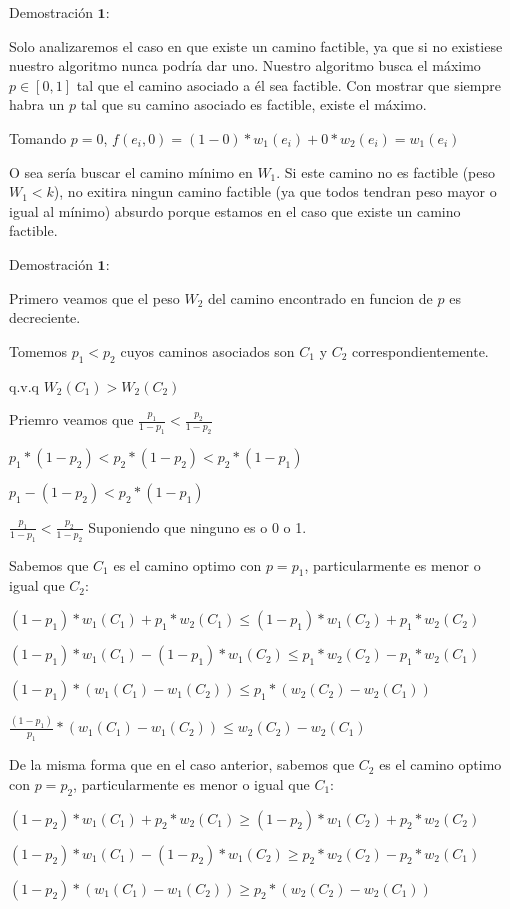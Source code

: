 Demostraci\'on $\mathbf{1}:$

Solo analizaremos el caso en que existe un camino factible, ya que si no existiese nuestro algoritmo nunca podr\'ia dar uno.
Nuestro algoritmo busca el m\'aximo $p \in [0,1]$ tal que el camino asociado a \'el sea factible. Con mostrar que siempre habra un $p$ tal que su camino asociado es factible, existe el m\'aximo.

Tomando $p=0$, $f(e_i,0) = (1-0)*w_1(e_i) + 0*w_2(e_i) = w_1(e_i)$

O sea ser\'ia buscar el camino m\'inimo en $W_1$. Si este camino no es factible (peso $W_1 < k$), no exitira ningun camino factible (ya que todos tendran peso mayor o igual al m\'inimo) absurdo porque estamos en el caso que existe un camino factible.

Demostraci\'on $\mathbf{1}:$

Primero veamos que el peso $W_2$ del camino encontrado en funcion de $p$ es decreciente.

Tomemos $p_1 < p_2$ cuyos caminos asociados son $C_1$ y $C_2$ correspondientemente.

q.v.q $W_2(C_1) > W_2(C_2)$

Priemro veamos que $\frac{p_1}{1-p_1} < \frac{p_2}{1-p_2}$

$ p_1* (1-p_2) < p_2 * (1-p_2) < p_2 * (1-p_1)$

$ p_1 - (1-p_2) < p_2 * (1-p_1)$

$ \frac{p_1}{1-p_1} < \frac{p_2}{1-p_2} $ Suponiendo que ninguno es o 0 o 1.


Sabemos que $C_1$ es el camino optimo con $p=p_1$, particularmente es menor o igual que $C_2$:

$(1-p_1)*w_1(C_1) + p_1*w_2(C_1) \leq (1-p_1)*w_1(C_2) + p_1*w_2(C_2) $

$(1-p_1)*w_1(C_1) - (1-p_1)*w_1(C_2) \leq  p_1*w_2(C_2) - p_1*w_2(C_1) $

$(1-p_1)*(w_1(C_1) - w_1(C_2)) \leq  p_1*(w_2(C_2) - w_2(C_1)) $

$\frac{(1-p_1)}{p_1}*(w_1(C_1) - w_1(C_2)) \leq  w_2(C_2) - w_2(C_1) $

De la misma forma que en el caso anterior, sabemos que $C_2$ es el camino optimo con $p=p_2$, particularmente es menor o igual que $C_1$:

$(1-p_2)*w_1(C_1) + p_2*w_2(C_1) \geq (1-p_2)*w_1(C_2) + p_2*w_2(C_2) $

$(1-p_2)*w_1(C_1) - (1-p_2)*w_1(C_2) \geq  p_2*w_2(C_2) - p_2*w_2(C_1) $

$(1-p_2)*(w_1(C_1) - w_1(C_2)) \geq  p_2*(w_2(C_2) - w_2(C_1)) $

